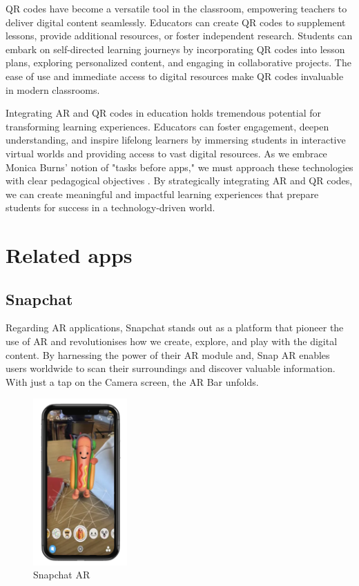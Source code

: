 \ac{QR} codes have become a versatile tool in the classroom, empowering teachers to deliver digital content seamlessly. Educators can create \ac{QR} codes to supplement lessons, provide additional resources, or foster independent research. Students can embark on self-directed learning journeys by incorporating \ac{QR} codes into lesson plans, exploring personalized content, and engaging in collaborative projects. The ease of use and immediate access to digital resources make \ac{QR} codes invaluable in modern classrooms.

Integrating \ac{AR} and \ac{QR} codes in education holds tremendous potential for transforming learning experiences. Educators can foster engagement, deepen understanding, and inspire lifelong learners by immersing students in interactive virtual worlds and providing access to vast digital resources. As we embrace Monica Burns' notion of "tasks before apps," we must approach these technologies with clear pedagogical objectives \cite{Burns2016}. By strategically integrating \ac{AR} and \ac{QR} codes, we can create meaningful and impactful learning experiences that prepare students for success in a technology-driven world.


\section{Related apps}
\subsection*{Snapchat}
Regarding \ac{AR} applications, Snapchat \cite{Snapchat} stands out as a platform that pioneer the use of \ac{AR} and revolutionises how we create, explore, and play with the digital content. By harnessing the power of their \ac{AR} module and, Snap \ac{AR} \cite{SnapAR} enables users worldwide to scan their surroundings and discover valuable information. With just a tap on the Camera screen, the \ac{AR} Bar unfolds.

\begin{figure}
    \centering
    \includegraphics[width=0.32\textwidth]{img/related-apps/Snapchat.png}
    \caption{Snapchat AR}
    \label{fig:snapchat}
\end{figure}

